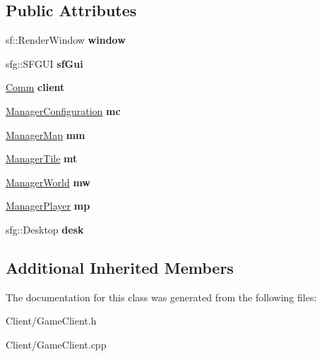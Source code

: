 \subsection*{Public Attributes}
\begin{DoxyCompactItemize}
\item 
\hypertarget{classbali_1_1_game_client_a4a34820b074ae1cb9d12208fbcfa7e6b}{sf\-::\-Render\-Window {\bfseries window}}\label{classbali_1_1_game_client_a4a34820b074ae1cb9d12208fbcfa7e6b}

\item 
\hypertarget{classbali_1_1_game_client_a4d46e2ba05f0e5ec03a2c6cff71c6e2f}{sfg\-::\-S\-F\-G\-U\-I {\bfseries sf\-Gui}}\label{classbali_1_1_game_client_a4d46e2ba05f0e5ec03a2c6cff71c6e2f}

\item 
\hypertarget{classbali_1_1_game_client_a1eb4599b895354a3c23f65fa4421a714}{\hyperlink{classbali_1_1_comm}{Comm} {\bfseries client}}\label{classbali_1_1_game_client_a1eb4599b895354a3c23f65fa4421a714}

\item 
\hypertarget{classbali_1_1_game_client_abe2d1ff8bda742d38a3788d59bdbbe0f}{\hyperlink{classbali_1_1_manager_configuration}{Manager\-Configuration} {\bfseries mc}}\label{classbali_1_1_game_client_abe2d1ff8bda742d38a3788d59bdbbe0f}

\item 
\hypertarget{classbali_1_1_game_client_a97ca97f6e6cc92c9c90f5530240adc6b}{\hyperlink{classbali_1_1_manager_map}{Manager\-Map} {\bfseries mm}}\label{classbali_1_1_game_client_a97ca97f6e6cc92c9c90f5530240adc6b}

\item 
\hypertarget{classbali_1_1_game_client_af4f15138972cc2f9dd689f4adf6532d2}{\hyperlink{classbali_1_1_manager_tile}{Manager\-Tile} {\bfseries mt}}\label{classbali_1_1_game_client_af4f15138972cc2f9dd689f4adf6532d2}

\item 
\hypertarget{classbali_1_1_game_client_acc4a1a6552f6e37312a0033252c3a9ff}{\hyperlink{classbali_1_1_manager_world}{Manager\-World} {\bfseries mw}}\label{classbali_1_1_game_client_acc4a1a6552f6e37312a0033252c3a9ff}

\item 
\hypertarget{classbali_1_1_game_client_a3ec1bfd158e655893e1a05316300b62d}{\hyperlink{classbali_1_1_manager_player}{Manager\-Player} {\bfseries mp}}\label{classbali_1_1_game_client_a3ec1bfd158e655893e1a05316300b62d}

\item 
\hypertarget{classbali_1_1_game_client_a158f5ac9925050e8313fe40202d67492}{sfg\-::\-Desktop {\bfseries desk}}\label{classbali_1_1_game_client_a158f5ac9925050e8313fe40202d67492}

\end{DoxyCompactItemize}
\subsection*{Additional Inherited Members}


The documentation for this class was generated from the following files\-:\begin{DoxyCompactItemize}
\item 
Client/Game\-Client.\-h\item 
Client/Game\-Client.\-cpp\end{DoxyCompactItemize}
